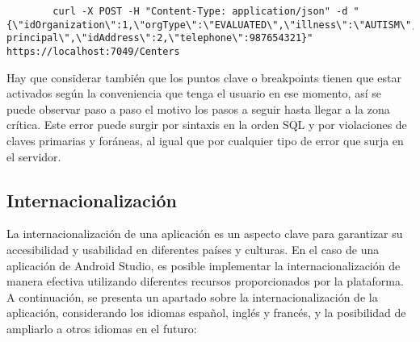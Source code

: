 \begin{itemize}
\begin{lstlisting}
        curl -X POST -H "Content-Type: application/json" -d "{\"idOrganization\":1,\"orgType\":\"EVALUATED\",\"illness\":\"AUTISM\",\"idCenter\":1,\"centerDescription\":\"Sede principal\",\"idAddress\":2,\"telephone\":987654321}" https://localhost:7049/Centers
    \end{lstlisting}
    Hay que considerar también que los puntos clave o breakpoints tienen que
    estar activados según la conveniencia que tenga el usuario en ese momento,
    así se puede observar paso a paso el motivo los pasos a seguir hasta llegar
    a la zona crítica. Este error puede surgir por sintaxis en la orden SQL y
    por violaciones de claves primarias y foráneas, al igual que por cualquier
    tipo de error que surja en el servidor.
\end{itemize}


\subsection{Internacionalización}

La internacionalización de una aplicación es un aspecto clave para garantizar su
accesibilidad y usabilidad en diferentes países y culturas. En el caso de una
aplicación de Android Studio, es posible implementar la internacionalización de
manera efectiva utilizando diferentes recursos proporcionados por la plataforma.
A continuación, se presenta un apartado sobre la internacionalización de la
aplicación, considerando los idiomas español, inglés y francés, y la posibilidad
de ampliarlo a otros idiomas en el futuro:

